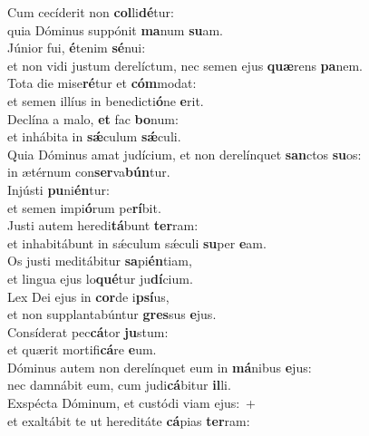 \oddverse Cum cecíderit non \textbf{col}li\textbf{dé}tur:~\*\\
\oddverse quia Dóminus suppónit \textbf{ma}num \textbf{su}am.\\
\evenverse Júnior fui, \textbf{é}tenim \textbf{sé}nui:~\*\\
\evenverse et non vidi justum derelíctum, nec semen ejus \textbf{quæ}rens \textbf{pa}nem.\\
\oddverse Tota die mise\textbf{ré}tur et \textbf{cóm}modat:~\*\\
\oddverse et semen illíus in benedicti\textbf{ó}ne \textbf{e}rit.\\
\evenverse Declína a malo, \textbf{et} fac \textbf{bo}num:~\*\\
\evenverse et inhábita in \textbf{sǽ}culum \textbf{sǽ}culi.\\
\oddverse Quia Dóminus amat judícium, et non derelínquet \textbf{san}ctos \textbf{su}os:~\*\\
\oddverse in ætérnum con\textbf{ser}va\textbf{bún}tur.\\
\evenverse Injústi \textbf{pu}ni\textbf{én}tur:~\*\\
\evenverse et semen impi\textbf{ó}rum pe\textbf{rí}bit.\\
\oddverse Justi autem heredi\textbf{tá}bunt \textbf{ter}ram:~\*\\
\oddverse et inhabitábunt in sǽculum sǽculi \textbf{su}per \textbf{e}am.\\
\evenverse Os justi meditábitur \textbf{sa}pi\textbf{én}tiam,~\*\\
\evenverse et lingua ejus lo\textbf{qué}tur ju\textbf{dí}cium.\\
\oddverse Lex Dei ejus in \textbf{cor}de i\textbf{psí}us,~\*\\
\oddverse et non supplantabúntur \textbf{gres}sus \textbf{e}jus.\\
\evenverse Consíderat pec\textbf{cá}tor \textbf{ju}stum:~\*\\
\evenverse et quærit mortifi\textbf{cá}re \textbf{e}um.\\
\oddverse Dóminus autem non derelínquet eum in \textbf{má}nibus \textbf{e}jus:~\*\\
\oddverse nec damnábit eum, cum judi\textbf{cá}bitur \textbf{il}li.\\
\evenverse Exspécta Dóminum, et custódi viam ejus:~+\\
\evenverse  et exaltábit te ut hereditáte \textbf{cá}pias \textbf{ter}ram:~\*\\
